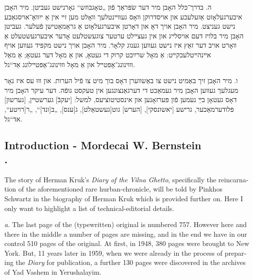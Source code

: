 \documentclass{article}
\begin{document}
\begin{pairs}
\begin{Rightside}
\begin{RTL}
\begin{hebrew}
ה. בדרך־כּלל האָבן מיר דער שׂפּראַך פֿוּן „טאָגבוזש“ גאָרנישט געביטן.
מיר האָבן איבערגעלאָזט אַזעלעכע און אויסדרוקן װאָס געװײנטלעך
װאָלט מען זײ אין אַ ייִװאָ־אויסגאַבע נישט געניצט. מיר האָבן אויך דאָ און
דאָרטן איבערגעלאָזט אַ גראַמאַטישן פֿעלער. געביטן האָבן מיר בלויז דעם
אויסלײג און אין געצײלט ערטער צוגעשטלעט אָדער איבערגעשטעלט אַ װאָרט
אויב דער זאַץ איז נישט געװען גענוג קלאָר. מיר האָבן אויך נישט מקפּיד
געװען אויף אײנהײטלעכקײט: אַ מאָל שרײַבט קרוק די געטאָ, און אַ מאָל
 דער געטאָ; אַ מאַל  װוּינונג־אָפּטײל און אַ מאָל װוּינונג־אָפּטײלונג אַד“גל.
 
 ו. מיר האָבן זיך באַמיט נישט צו באַשװערן דאָס בוך מיט צו פֿיל הערות.
 און װוּ עס איז נאָר מעגלעך געװען האָבן מיר געמאַכט די דערגאַנצונגען אין
 טעקסט גופֿה. דער עיקר האָבן מיר דאָס געטאָן בײַ נעמען פֿון פּערזאָנען און
 אינסטיטוציעס, למשל: [יעקבֿ] גערשטײן, [גערשון] פּלודערמאַכער, גרישע [יאשונסקי], [הערש] גוט[געשטאַלט], ג[ענס], „ב[ונד]“, „ר[רויטע“, אד“גל.


\endnumbering
\end{hebrew}
\end{RTL}
\end{Rightside}


\begin{Leftside}
\begin{english}
\section{
Introduction - Mordecai W. Bernstein \\  .  }
\beginnumbering
\autopar

The story of Herman Kruk's \emph{Diary of the Vilna Ghetto}, specifically the reincarnation 
of the aforementioned rare hurban-chronicle,
will be told by Pinkhos Schwartz in the biography of Herman Kruk which is provided further on. 
Here I only want to highlight a list of technical-editorial details.

\emph{a}. The last page of the  (typewritten) original is numbered 757. However here and there in the middle a number of pages are missing,
and in the end we have in our control 510 pages of the original.
At first, in 1948, 380 pages were brought to New York. But, 11 years later in 1959, 
when we were already in the process of preparing the \emph{Diary} for publication, a further 130 pages were discovered in the archives of Yad Vashem in Yerushalayim.


\end{english}
\end{Leftside}
\end{pairs}
\end{document}
